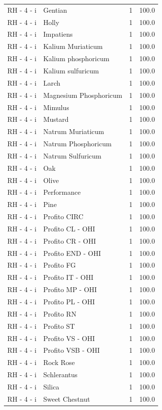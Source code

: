 \documentclass[a4paper,11pt]{article}
\begin{document}
\begin{footnotesize}
\begin{longtable}{p{3.5cm}p{7.5cm}rr}
RH - 4 - i & Gentian & 1 & 100.0 \\
RH - 4 - i & Holly & 1 & 100.0 \\
RH - 4 - i & Impatiens & 1 & 100.0 \\
RH - 4 - i & Kalium Muriaticum & 1 & 100.0 \\
RH - 4 - i & Kalium phosphoricum & 1 & 100.0 \\
RH - 4 - i & Kalium sulfuricum & 1 & 100.0 \\
RH - 4 - i & Larch & 1 & 100.0 \\
RH - 4 - i & Magnesium Phosphoricum & 1 & 100.0 \\
RH - 4 - i & Mimulus & 1 & 100.0 \\
RH - 4 - i & Mustard & 1 & 100.0 \\
RH - 4 - i & Natrum Muriaticum & 1 & 100.0 \\
RH - 4 - i & Natrum Phosphoricum & 1 & 100.0 \\
RH - 4 - i & Natrum Sulfuricum & 1 & 100.0 \\
RH - 4 - i & Oak & 1 & 100.0 \\
RH - 4 - i & Olive & 1 & 100.0 \\
RH - 4 - i & Performance & 1 & 100.0 \\
RH - 4 - i & Pine & 1 & 100.0 \\
RH - 4 - i & Profito CIRC & 1 & 100.0 \\
RH - 4 - i & Profito CL - OHI & 1 & 100.0 \\
RH - 4 - i & Profito CR - OHI & 1 & 100.0 \\
RH - 4 - i & Profito END - OHI & 1 & 100.0 \\
RH - 4 - i & Profito FG & 1 & 100.0 \\
RH - 4 - i & Profito IT - OHI & 1 & 100.0 \\
RH - 4 - i & Profito MP - OHI & 1 & 100.0 \\
RH - 4 - i & Profito PL - OHI & 1 & 100.0 \\
RH - 4 - i & Profito RN & 1 & 100.0 \\
RH - 4 - i & Profito ST & 1 & 100.0 \\
RH - 4 - i & Profito VS - OHI & 1 & 100.0 \\
RH - 4 - i & Profito VSB - OHI & 1 & 100.0 \\
RH - 4 - i & Rock Rose & 1 & 100.0 \\
RH - 4 - i & Schlerantus & 1 & 100.0 \\
RH - 4 - i & Silica & 1 & 100.0 \\
RH - 4 - i & Sweet Chestnut & 1 & 100.0 \\

\end{longtable}
\end{footnotesize}
\end{document}
